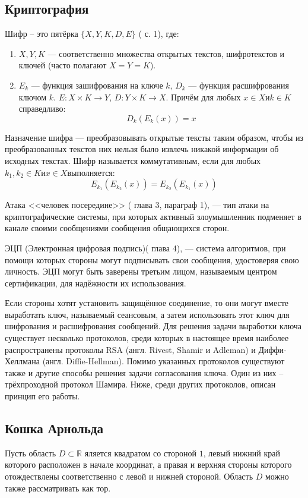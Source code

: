 \subsection{Криптография}
Шифр – это пятёрка $\{X, Y, K, D, E\}$ (\autocite{Drs} с. 1), где:
\begin{enumerate}
	\item $X, Y, K$ --- соответственно множества открытых текстов, шифротекстов и ключей (часто полагают $X = Y = K$).\\
	\item $E_{k}$ --- функция зашифрования на ключе $k$, $D_{k}$ --- функция расшифрования ключом $k$. $E : X \times K \rightarrow Y$, $D : Y \times K \rightarrow X$. Причём для любых $x \in X и k \in K$справедливо:
	$$D_{k}(E_{k}(x)) = x$$
\end{enumerate}

Назначение шифра --- преобразовывать открытые тексты таким образом, чтобы из преобразованных текстов них нельзя было извлечь никакой информации об исходных текстах. 
Шифр называется коммутативным, если для любых $k_{1},k_{2}\in K и x  \in X$выполняется:
		$$E_{k_{1}}(E_{k_{2}}(x)) = E_{k_{2}}(E_{k_{1}}(x))$$
		
Атака <<человек посередине>> (\autocite{Shnayer} глава 3, параграф 1), --- тип атаки на криптографические системы, при которых активный злоумышленник подменяет в канале своими сообщениями сообщения общающихся сторон.

ЭЦП (Электронная цифровая подпись)(\autocite{Shnayer} глава 4), --- система алгоритмов, при помощи которых стороны могут подписывать свои сообщения, удостоверяя свою личность. ЭЦП могут быть заверены третьим лицом, называемым центром сертификации, для надёжности их использования.

Если стороны хотят установить защищённое соединение, то они могут вместе выработать ключ, называемый сеансовым, а затем использовать этот ключ для шифрования и расшифрования сообщений. Для решения задачи выработки ключа существует несколько протоколов, среди которых в настоящее время наиболее распространены протоколы RSA (англ. Rivest, Shamir и Adleman) и Диффи-Хеллмана (англ. Diffie-Hellman). 
Помимо указанных протоколов существуют также и другие способы решения задачи согласования ключа. Один из них – трёхпроходной протокол Шамира. Ниже, среди других протоколов, описан принцип его работы.
\subsection{Кошка Арнольда}
Пусть область $D\subset \mathbb{R}$ яляется квадратом со стороной $1$, левый нижний край которого расположен в начале координат, а правая и верхняя стороны которого отождествлены соответственно с левой и нижней стороной. Область $D$ можно  также рассматривать как тор.

